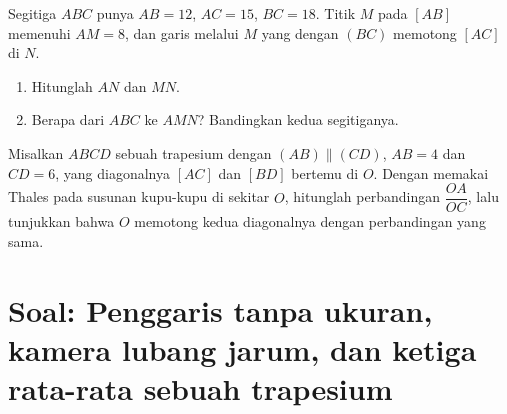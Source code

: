 \begin{exercise}[$\star\star$]\label{exo:g9:thales:8}
Segitiga $ABC$ punya $AB = 12$, $AC = 15$, $BC = 18$. Titik $M$ pada
$[AB]$ memenuhi $AM = 8$, dan garis melalui $M$ yang  dengan
$(BC)$ memotong $[AC]$ di $N$.
\begin{enumerate}
  \item Hitunglah $AN$ dan $MN$.
  \item Berapa  dari $ABC$ ke $AMN$? Bandingkan
         kedua segitiganya.
\end{enumerate}
\end{exercise}

\begin{exercise}[$\star\star\star$]\label{exo:g9:thales:9}
Misalkan $ABCD$ sebuah trapesium dengan $(AB) \parallel (CD)$,
$AB = 4$ dan $CD = 6$, yang diagonalnya $[AC]$ dan $[BD]$ bertemu di
$O$. Dengan memakai Thales pada susunan kupu-kupu di sekitar $O$,
hitunglah perbandingan $\dfrac{OA}{OC}$, lalu tunjukkan bahwa $O$
memotong kedua diagonalnya dengan perbandingan yang sama.
\end{exercise}

\section{Soal: Penggaris tanpa ukuran, kamera lubang jarum, dan
ketiga rata-rata sebuah trapesium}

